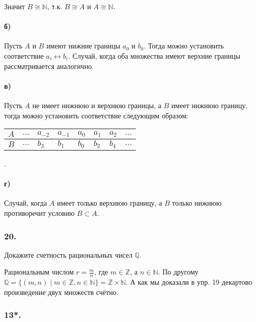 \documentclass{book}
\begin{document}
Значит $B \cong \mathbb{N}$, т.к. $B \cong A$ и $A \cong \mathbb{N}$.

\paragraph{б)} Пусть $A$ и $B$ имеют нижние границы $a_0$ и $b_0$. Тогда можно установить соответствие $a_i \leftrightarrow b_i$. Случай, когда оба множества имеют верхние границы рассматривается аналогично.

\paragraph{в)} Пусть $A$ не имеет нижнюю и верхнюю границы, а $B$ имеет нижнюю границу, тогда можно установить соответствие следующим образом:

\begin{tabularx}{0.6\textwidth} { 
    | >{\centering\arraybackslash}X
    | >{\centering\arraybackslash}X
    | >{\centering\arraybackslash}X
    | >{\centering\arraybackslash}X
    | >{\centering\arraybackslash}X
    | >{\centering\arraybackslash}X
    | >{\centering\arraybackslash}X 
  | >{\centering\arraybackslash}X | }
 \hline  $A$ & $\dots$ & $a_{-2}$ & $a_{-1}$ & $a_0$ & $a_{1}$ & $a_{2}$ & $\dots$ \\
 \hline  $B$ & $\dots$ & $b_{3}$ & $b_{1}$ & $b_0$ & $b_{2}$ & $b_{4}$ & $\dots$ \\
 \hline
\end{tabularx}.

\paragraph{г)} Случай, когда $A$ имеет только верхнюю границу, а $B$ только нижнюю противоречит условию $B \subset A$.

\subsubsection{20.}

Докажите счетность рациональных чисел $\mathbb{Q}$.

Рациональным числом $r = \frac{m}{n}$, где $m \in \mathbb{Z}$, а $n \in \mathbb{N}$. По другому $\mathbb{Q} = \{(m,n)\mid m \in \mathbb{Z}, n \in \mathbb{N}\} = \mathbb{Z} \times \mathbb{N}$. А как мы доказали в упр. 19 декартово произведение двух множеств счётно.

\subsubsection{13*.}
\end{document}

